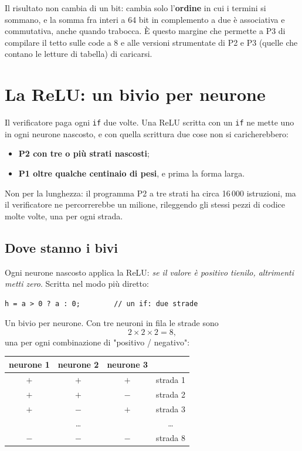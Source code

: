 \documentclass[11pt,a4paper,oneside]{report}
\begin{document}
Il risultato non cambia di un bit: cambia solo l'\textbf{ordine} in cui i
termini si sommano, e la somma fra interi a 64 bit in complemento a due è
associativa e commutativa, anche quando trabocca. È questo margine che permette
a P3 di compilare il tetto sulle code a 8 e alle versioni strumentate di P2 e P3
(quelle che contano le letture di tabella) di caricarsi.

\section{La ReLU: un bivio per neurone}

Il verificatore paga ogni \texttt{if} due volte. Una ReLU scritta con un
\texttt{if} ne mette uno in ogni neurone nascosto, e con quella scrittura due
cose non si caricherebbero:

\begin{itemize}
  \item \textbf{P2 con tre o più strati nascosti};
  \item \textbf{P1 oltre qualche centinaio di pesi}, e prima la forma larga.
\end{itemize}

Non per la lunghezza: il programma P2 a tre strati ha circa 16\,000
istruzioni, ma il verificatore ne percorrerebbe un milione, rileggendo gli
stessi pezzi di codice molte volte, una per ogni strada.

\subsection*{Dove stanno i bivi}

Ogni neurone nascosto applica la ReLU: \emph{se il valore è positivo tienilo,
altrimenti metti zero}. Scritta nel modo più diretto:

\begin{lstlisting}
h = a > 0 ? a : 0;        // un if: due strade
\end{lstlisting}

Un bivio per neurone. Con tre neuroni in fila le strade sono
\[
  2 \times 2 \times 2 = 8 ,
\]
una per ogni combinazione di "positivo / negativo":

\begin{center}
\small
\begin{tabular}{@{}cccc@{}}
\toprule
\textbf{neurone 1} & \textbf{neurone 2} & \textbf{neurone 3} & \\
\midrule
$+$ & $+$ & $+$ & strada 1 \\
$+$ & $+$ & $-$ & strada 2 \\
$+$ & $-$ & $+$ & strada 3 \\
\multicolumn{3}{c}{\dots} & \dots \\
$-$ & $-$ & $-$ & strada 8 \\
\bottomrule
\end{tabular}
\end{center}
\end{document}
